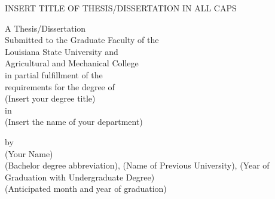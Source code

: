 \documentclass[12pt,letterpaper]{lsuetd}
\begin{document}
\renewcommand\@pnumwidth{1.55em}
\renewcommand\@tocrmarg{9.55em}
\renewcommand*\l@chapter{\@dottedtocline{0}{1.5em}{2.3em}}
\renewcommand*\l@figure{\@dottedtocline{1}{0em}{3.1em}}
\let\l@table\l@figure

\thispagestyle{empty}
\begin{center}
INSERT TITLE OF THESIS/DISSERTATION IN ALL CAPS

\vfill
\doublespacing
A Thesis/Dissertation \\
\singlespacing
Submitted to the Graduate Faculty of the \\
Louisiana State University and \\
Agricultural and Mechanical College \\
in partial fulfillment of the \\
requirements for the degree of \\
(Insert your degree title) \\
\doublespacing
in \\
                                       
(Insert the name of your department) \\
\singlespacing
\vfill

by \\
(Your Name) \\
(Bachelor degree abbreviation), (Name of Previous University), (Year of Graduation with Undergraduate Degree)  \\
(Anticipated month and year of graduation)
\end{center}
\pagebreak


\end{document}
